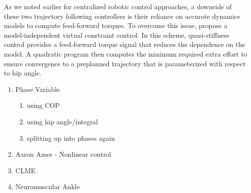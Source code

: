 As we noted earlier for centralized robotic control approaches, a downside of
these two trajectory following controllers is their reliance on accurate
dynamics models to compute feed-forward torques. To overcome this issue,
\citet{zhao2016first} propose a model-independent virtual constraint control. In
this scheme, quasi-stiffness control provides a feed-forward torque signal that
reduces the dependence on the model. A quadratic program then computes the
minimum required extra effort to ensure convergence to a preplanned trajectory
that is parameterized with respect to hip angle.

\begin{enumerate}
    \item Phase Variable
        \begin{enumerate}
            \item using COP
            \item using hip angle/integral
            \item splitting up into phases again
        \end{enumerate}
    \item Aaron Ames - Nonlinear control 
    \item CLME
    \item Neuromuscular Ankle
\end{enumerate}

